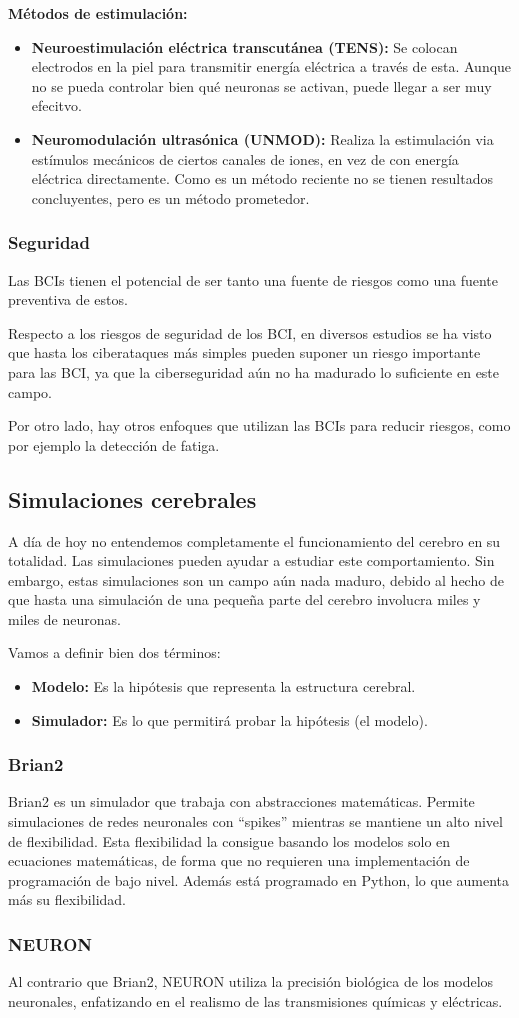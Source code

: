 \documentclass[12pt, letterpaper]{article}
\begin{document}
\textbf{Métodos de estimulación:}
\begin{itemize}
    \item \textbf{Neuroestimulación eléctrica transcutánea (TENS):} Se colocan electrodos en la piel para transmitir energía eléctrica a través de esta. Aunque no se pueda controlar bien qué neuronas se activan, puede llegar a ser muy efecitvo.
    \item \textbf{Neuromodulación ultrasónica (UNMOD):} Realiza la estimulación via estímulos mecánicos de ciertos canales de iones, en vez de con energía eléctrica directamente. Como es un método reciente no se tienen resultados concluyentes, pero es un método prometedor.
\end{itemize}

\subsubsection{Seguridad}
Las BCIs tienen el potencial de ser tanto una fuente de riesgos como una fuente preventiva de estos.

Respecto a los riesgos de seguridad de los BCI, en diversos estudios se ha visto que hasta los ciberataques más simples pueden suponer un riesgo importante para las BCI, ya que la ciberseguridad aún no ha madurado lo suficiente en este campo.

Por otro lado, hay otros enfoques que utilizan las BCIs para reducir riesgos, como por ejemplo la detección de fatiga.

\subsection{Simulaciones cerebrales}
A día de hoy no entendemos completamente el funcionamiento del cerebro en su totalidad. Las simulaciones pueden ayudar a estudiar este comportamiento. Sin embargo, estas simulaciones son un campo aún nada maduro, debido al hecho de que hasta una simulación de una pequeña parte del cerebro involucra miles y miles de neuronas.

Vamos a definir bien dos términos:
\begin{itemize}
    \item \textbf{Modelo:} Es la hipótesis que representa la estructura cerebral.
    \item \textbf{Simulador:} Es lo que permitirá probar la hipótesis (el modelo).
\end{itemize}


\subsubsection{Brian2}
Brian2 es un simulador que trabaja con abstracciones matemáticas. Permite simulaciones de redes neuronales con ``spikes'' mientras se mantiene un alto nivel de flexibilidad. Esta flexibilidad la consigue basando los modelos solo en ecuaciones matemáticas, de forma que no requieren una implementación de programación de bajo nivel. Además está programado en Python, lo que aumenta más su flexibilidad.

\subsubsection{NEURON}
Al contrario que Brian2, NEURON utiliza la precisión biológica de los modelos neuronales, enfatizando en el realismo de las transmisiones químicas y eléctricas. 
\end{document}
